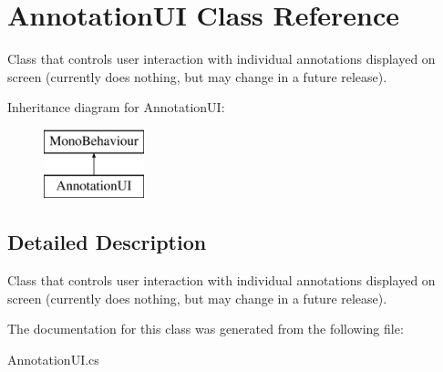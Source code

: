 \section{Annotation\+UI Class Reference}
\label{class_annotation_u_i}


Class that controls user interaction with individual annotations displayed on screen (currently does nothing, but may change in a future release).  


Inheritance diagram for Annotation\+UI\+:\begin{figure}[H]
\begin{center}
\leavevmode
\includegraphics[height=2.000000cm]{class_annotation_u_i}
\end{center}
\end{figure}


\subsection{Detailed Description}
Class that controls user interaction with individual annotations displayed on screen (currently does nothing, but may change in a future release). 



The documentation for this class was generated from the following file\+:\begin{DoxyCompactItemize}
\item 
Annotation\+U\+I.\+cs\end{DoxyCompactItemize}
